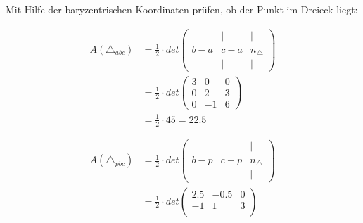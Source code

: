 \documentclass{article}
\begin{document}
Mit Hilfe der baryzentrischen Koordinaten prüfen, ob der Punkt im Dreieck liegt:

\[
    \begin{aligned}
        A(\triangle_{abc}) & = \frac{1}{2} \cdot det \begin{pmatrix}
                                                         |   & |   & |             \\
                                                         b-a & c-a & n_{\triangle} \\
                                                         |   & |   & |
                                                     \end{pmatrix} \\
                           & = \frac{1}{2} \cdot det \begin{pmatrix}
                                                         3 & 0  & 0 \\
                                                         0 & 2  & 3 \\
                                                         0 & -1 & 6
                                                     \end{pmatrix}            \\
                           & = \frac{1}{2} \cdot 45 = 22.5                     \\
                           &                                                   \\
                           &                                                   \\
        A(\triangle_{pbc}) & = \frac{1}{2} \cdot det \begin{pmatrix}
                                                         |   & |   & |             \\
                                                         b-p & c-p & n_{\triangle} \\
                                                         |   & |   & |
                                                     \end{pmatrix} \\
                           & = \frac{1}{2} \cdot det \begin{pmatrix}
                                                         2.5 & -0.5 & 0 \\
                                                         -1   & 1    & 3 \\

\end{pmatrix}
\end{aligned}\]
\end{document}
